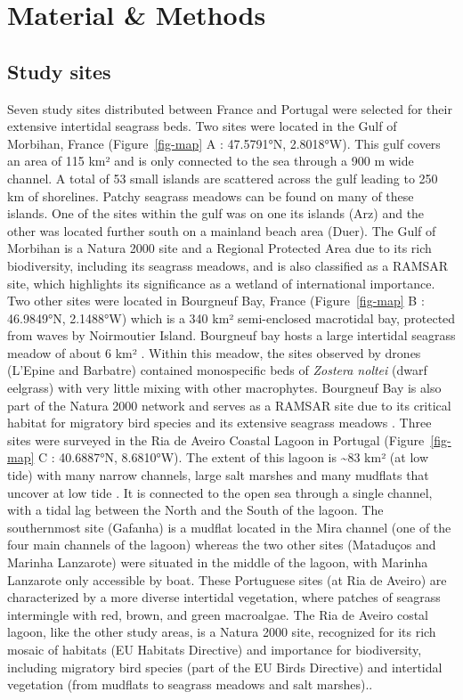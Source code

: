 \documentclass[
  number]{elsarticle}
\begin{document}
\section{Material \& Methods}\label{material-methods}

\subsection{Study sites}\label{study-sites}

Seven study sites distributed between France and Portugal were selected
for their extensive intertidal seagrass beds. Two sites were located in
the Gulf of Morbihan, France (Figure~\ref{fig-map} A : 47.5791°N,
2.8018°W). This gulf covers an area of 115 km² and is only connected to
the sea through a 900 m wide channel. A total of 53 small islands are
scattered across the gulf leading to 250 km of shorelines. Patchy
seagrass meadows can be found on many of these islands. One of the sites
within the gulf was on one its islands (Arz) and the other was located
further south on a mainland beach area (Duer). The Gulf of Morbihan is a
Natura 2000 site and a Regional Protected Area due to its rich
biodiversity, including its seagrass meadows, and is also classified as
a RAMSAR site, which highlights its significance as a wetland of
international importance. Two other sites were located in Bourgneuf Bay,
France (Figure~\ref{fig-map} B : 46.9849°N, 2.1488°W) which is a 340 km²
semi-enclosed macrotidal bay, protected from waves by Noirmoutier
Island. Bourgneuf bay hosts a large intertidal seagrass meadow of about
6 km² \citep{ZOFFOLI2020112020}. Within this meadow, the sites observed
by drones (L'Epine and Barbatre) contained monospecific beds of
\emph{Zostera noltei} (dwarf eelgrass) with very little mixing with
other macrophytes. Bourgneuf Bay is also part of the Natura 2000 network
and serves as a RAMSAR site due to its critical habitat for migratory
bird species and its extensive seagrass meadows \citep{Zoffoli2022}.
Three sites were surveyed in the Ria de Aveiro Coastal Lagoon in
Portugal (Figure~\ref{fig-map} C : 40.6887°N, 8.6810°W). The extent of
this lagoon is \textasciitilde83 km² (at low tide) with many narrow
channels, large salt marshes and many mudflats that uncover at low tide
\citep{sousa2017blue}. It is connected to the open sea through a single
channel, with a tidal lag between the North and the South of the lagoon.
The southernmost site (Gafanha) is a mudflat located in the Mira channel
(one of the four main channels of the lagoon) whereas the two other
sites (Mataduços and Marinha Lanzarote) were situated in the middle of
the lagoon, with Marinha Lanzarote only accessible by boat. These
Portuguese sites (at Ria de Aveiro) are characterized by a more diverse
intertidal vegetation, where patches of seagrass intermingle with red,
brown, and green macroalgae. The Ria de Aveiro costal lagoon, like the
other study areas, is a Natura 2000 site, recognized for its rich mosaic
of habitats (EU Habitats Directive) and importance for biodiversity,
including migratory bird species (part of the EU Birds Directive) and
intertidal vegetation (from mudflats to seagrass meadows and salt
marshes)..
\end{document}
